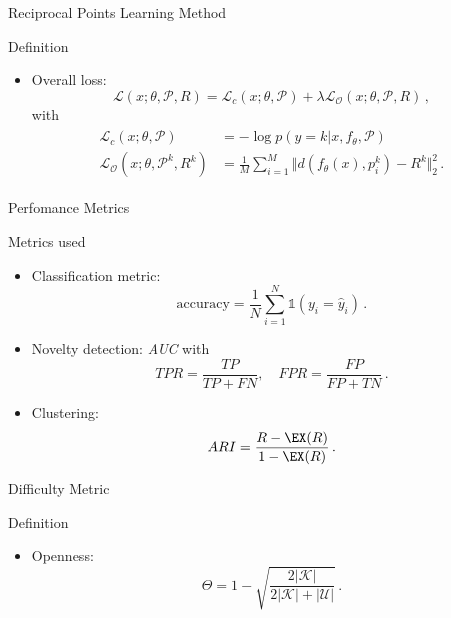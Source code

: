 \begin{frame}{Reciprocal Points Learning Method}
    \begin{definitionblock}{Definition}
        \begin{itemize}
          \item Overall loss: 
          \[
              \mathcal{L}(x; \theta, \mathcal{P}, R) = \mathcal{L}_c(x; \theta, \mathcal{P}) + \lambda \mathcal{L}_{\mathcal{O}}(x; \theta, \mathcal{P}, R)\,,
          \]
          with
          \begin{align*}
              \begin{aligned}
                  \mathcal{L}_c(x;\theta, \mathcal{P}) &= -\log p(y=k|x, f_{\theta}, \mathcal{P}) \\
                  \mathcal{L}_{\mathcal{O}}(x; \theta, \mathcal{P}^k, R^k) &= \frac{1}{M}\sum_{i=1}^M \Vert d(f_{\theta}(x), p_i^k)-R^k \Vert^2_2\,.
              \end{aligned}
          \end{align*}
        \end{itemize}
    \end{definitionblock}
\end{frame}

\begin{frame}{Perfomance Metrics}
    \begin{normalblock}{Metrics used}
        \begin{itemize}
          \item<1-> Classification metric:
          \[
              \text{accuracy} = \frac{1}{N}\sum_{i=1}^N \mathds{1} (y_i = \hat{y}_i)\,.
          \]
          \item<2-> Novelty detection: \emph{AUC} with 
          \[
              TPR = \frac{TP}{TP+FN}, \quad FPR = \frac{FP}{FP+TN}\,.
          \]
          \item<3-> Clustering: 
          \[
              ARI = \frac{R-\EX(R)}{1-\EX(R)}\,.
          \]
        \end{itemize}
    \end{normalblock}
\end{frame}

\begin{frame}{Difficulty Metric}
    \begin{definitionblock}{Definition}
        \begin{itemize}
            \item Openness: 
            \[
                \Theta = 1 - \sqrt{\frac{2|\mathcal{K}|}{2|\mathcal{K}| + |\mathcal{U}|}}\,.
            \]
        \end{itemize}
    \end{definitionblock}
\end{frame}